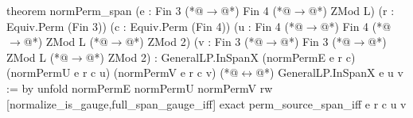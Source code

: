 theorem normPerm_span (e : Fin 3 (*@$\to$@*) Fin 4 (*@$\to$@*) ZMod L)
    (r : Equiv.Perm (Fin 3)) (c : Equiv.Perm (Fin 4))
    (u : Fin 4 (*@$\to$@*) Fin 4 (*@$\to$@*) ZMod L (*@$\to$@*) ZMod 2)
    (v : Fin 3 (*@$\to$@*) Fin 3 (*@$\to$@*) ZMod L (*@$\to$@*) ZMod 2) :
    GeneralLP.InSpanX (normPermE e r c) (normPermU e r c u) (normPermV e r c v) (*@$\leftrightarrow$@*)
      GeneralLP.InSpanX e u v := by
  unfold normPermE normPermU normPermV
  rw [normalize_is_gauge,full_span_gauge_iff]
  exact perm_source_span_iff e r c u v
